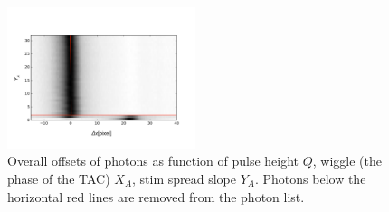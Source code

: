 \documentclass[12pt, preprint]{aastex}
\begin{document}
\begin{figure}[p]
\begin{center}
\includegraphics[width=0.49\textwidth]{figures/ya-y_tot-new}
\end{center}
\caption{%
  \label{meta}
  Overall offsets of photons as function of pulse height $Q$,  wiggle (the phase of the TAC)  $X_A$,  stim spread slope $Y_A$.
  Photons below the horizontal red lines are removed from the photon list.
  }
\end{figure}
\end{document}
